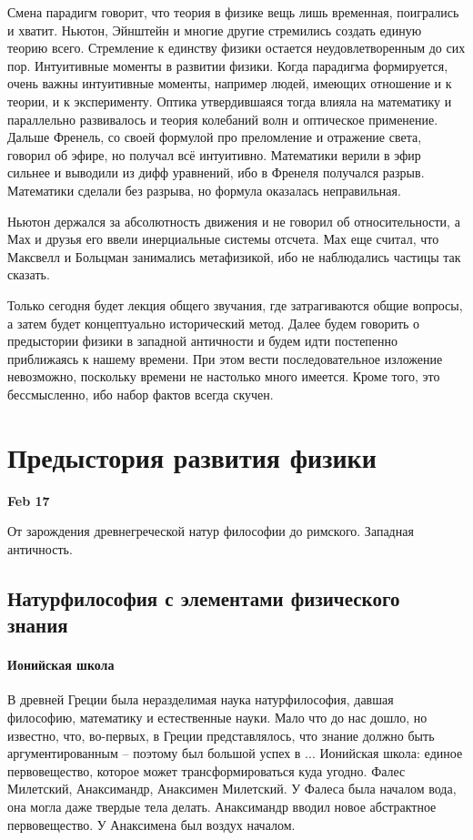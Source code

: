 \documentclass[a4paper, 12pt]{article}
\begin{document}
Смена парадигм говорит, что теория в физике вещь лишь временная, 
поигрались и хватит. Ньютон, Эйнштейн и многие другие стремились 
создать единую теорию всего. Стремление к единству физики остается 
неудовлетворенным до сих пор. Интуитивные моменты в развитии 
физики. Когда парадигма формируется, очень важны интуитивные 
моменты, например людей, имеющих отношение и к теории, 
и к эксперименту. Оптика утвердившаяся тогда влияла на математику 
и параллельно развивалось и теория колебаний волн и оптическое 
применение. Дальше Френель, со своей формулой про преломление 
и отражение света, говорил об эфире, но получал всё интуитивно. 
Математики верили в эфир сильнее и выводили из дифф уравнений, ибо 
в Френеля получался разрыв. Математики сделали без разрыва, но 
формула оказалась неправильная.

Ньютон держался за абсолютность движения и не говорил об 
относительности, а Мах и друзья его ввели инерциальные системы 
отсчета. Мах еще считал, что Максвелл и Больцман занимались 
метафизикой, ибо не наблюдались частицы так сказать.

Только сегодня будет лекция общего звучания, где затрагиваются 
общие вопросы, а затем будет концептуально исторический метод. 
Далее будем говорить о предыстории физики в западной античности 
и будем идти постепенно приближаясь к нашему времени. При этом 
вести последовательное изложение невозможно, поскольку времени не 
настолько много имеется. Кроме того, это бессмысленно, ибо набор 
фактов всегда скучен.


\section{Предыстория развития физики}

\hfill \textbf{Feb 17}

От зарождения древнегреческой натур философии до римского. Западная 
античность.

\subsection{Натурфилософия с элементами физического знания}

\paragraph{Ионийская школа}
В древней Греции была неразделимая наука натурфилософия, давшая 
философию, математику и естественные науки. Мало что до нас дошло, но 
известно, что, во-первых, в Греции представлялось, что знание должно 
быть аргументированным -- поэтому был большой успех в ... Ионийская 
школа: единое первовещество, которое может трансформироваться куда 
угодно. Фалес Милетский, Анаксимандр, Анаксимен Милетский. У Фалеса 
была началом вода, она могла даже твердые тела делать. Анаксимандр 
вводил новое абстрактное первовещество. У Анаксимена был воздух 
началом.
\end{document}
